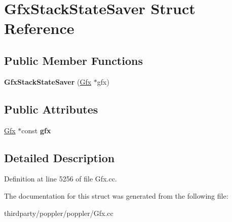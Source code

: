 \hypertarget{struct_gfx_stack_state_saver}{}\section{Gfx\+Stack\+State\+Saver Struct Reference}
\label{struct_gfx_stack_state_saver}
\subsection*{Public Member Functions}
\begin{DoxyCompactItemize}
\item 
\mbox{\label{struct_gfx_stack_state_saver_ac9f17e822b6b6d0e39607b28071e81f9}} 
{\bfseries Gfx\+Stack\+State\+Saver} (\hyperlink{class_gfx}{Gfx} $\ast$gfx)
\end{DoxyCompactItemize}
\subsection*{Public Attributes}
\begin{DoxyCompactItemize}
\item 
\mbox{\label{struct_gfx_stack_state_saver_a8e4687d89b49f72d0ab564a9c8feee16}} 
\hyperlink{class_gfx}{Gfx} $\ast$const {\bfseries gfx}
\end{DoxyCompactItemize}


\subsection{Detailed Description}


Definition at line 5256 of file Gfx.\+cc.



The documentation for this struct was generated from the following file\+:\begin{DoxyCompactItemize}
\item 
thirdparty/poppler/poppler/Gfx.\+cc\end{DoxyCompactItemize}
